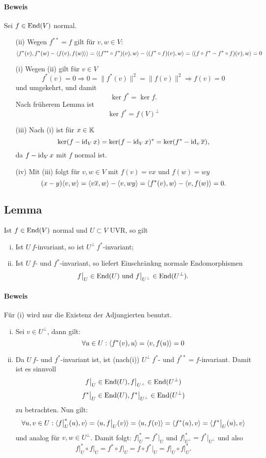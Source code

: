 \paragraph{Beweis}
	Sei $ f\in \operatorname{End}(V) $ normal.
		\begin{enumerate}
			\item[(ii)] Wegen $ f^{**} = f $ gilt für $ v,w\in V $:
				\[ \langle f^*(v),f^*(w)-\langle f(v),f(w) \rangle \rangle = \langle (f^{**}\circ f^*)(v),w \rangle-\langle (f^*\circ f)(v),w \rangle = \langle (f\circ f^*-f^*\circ f)(v),w \rangle = 0 \]
			\item[(i)] Wegen (ii) gilt für $ v\in V $
				\[ f^*(v) = 0 \Rightarrow 0 = \|f^*(v)\|^2 = \|f(v)\|^2\Rightarrow f(v) = 0 \]
				und umgekehrt, und damit
				\[ \ker f^* = \ker f. \]
				Nach früherem Lemma ist
					\[ \ker f^* = f(V)^\perp \]
			\item[(iii)] Nach (i) ist für $ x\in \mathbb{K} $
				\[ \ker(f-\operatorname{id}_Vx) = \ker(f-\operatorname{id}_Vx)^* = \ker(f^*-\operatorname{id}_v\overline{x}), \]
				da $ f-\operatorname{id}_Vx $ mit $ f $ normal ist.
			\item[(iv)] Mit (iii) folgt für $ v,w\in V $ mit $ f(v) = vx $ und $ f(w) = wy $	\[ (x-y)\langle v,w \rangle=\langle v\overline{x},w \rangle-\langle v,wy \rangle = \langle f^*(v),w \rangle-\langle v,f(w) \rangle = 0. \] 
		\end{enumerate}

\subsection{Lemma}
\begin{Lemma}[]
	Ist $ f\in \operatorname{End}(V) $ normal und $ U\subset V $ UVR, so gilt
		\begin{enumerate}[(i)]
			\item Ist $ U\ f $-invariant, so ist $ U^\perp\ f^* $-invariant;
			\item Ist $ U\ f $- und $ f^* $-invariant, so liefert Einschränkng normale Endomorphismen
				\[ f\big|_U \in \operatorname{End}(U) \text{ und } f\big|_{U^\perp}\in \operatorname{End}(U^\perp). \]
		\end{enumerate}
\end{Lemma}
\paragraph{Beweis}
	Für (i) wird nur die Existenz der Adjungierten benutzt.
		\begin{enumerate}[(i)]
			\item Sei $ v\in U^\perp $, dann gilt:
				\[ \forall u\in U: \langle f^*(v),u \rangle = \langle v,f(u) \rangle = 0 \]
			\item Da $ U\ f $- und $ f^* $-invariant ist, ist (nach(i)) $ U^\perp\ f^*$- und $ f^{**} = f $-invariant.		
			Damit ist es sinnvoll
				\[ f\big|_U \in \operatorname{End}(U), f\big|_{U^\perp}\in \operatorname{End}(U^\perp) \]
				\[ f^*\big|_U\in \operatorname{End}(U), f^*\big|_{U^\perp}\in \operatorname{End}(U^\perp) \]
			zu betrachten. Nun gilt:
				\[ \forall u,v\in U: \langle f\big|_U^*(u),v \rangle = \langle u,f\big|_U(v) \rangle = \langle u,f(v) \rangle = \langle f^*(u),v \rangle = \langle f^*\big|_U(u),v \rangle \]
			und analog für $ v,w\in U^\perp $. Damit folgt: $ f\big|_U^* = f^*\big|_U $ und $ f\big|^*_{U^\perp} = f^*\big|_{U^\perp}$ und also
				\[ f\big|_U^* \circ f\big|_U = f^*\circ f\big|_U = f\circ f^*\big|_U = f\big|_U \circ f\big|_U^*. \]
		\end{enumerate}
